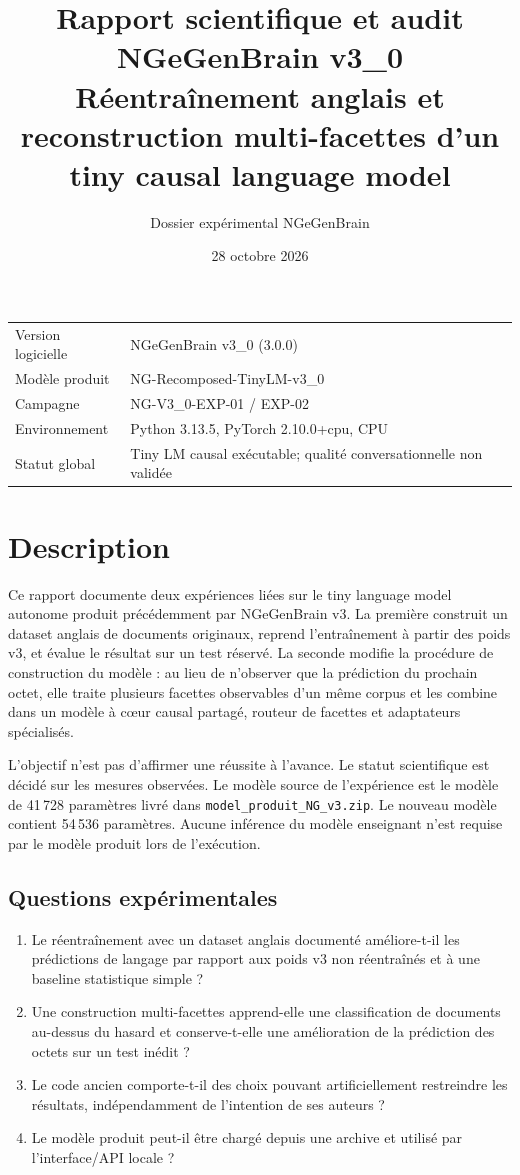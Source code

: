 \documentclass[11pt,a4paper]{article}
\title{\textbf{Rapport scientifique et audit}\\NGeGenBrain v3\_0\\[0.5em]\large Réentraînement anglais et reconstruction multi-facettes d'un tiny causal language model}
\author{Dossier expérimental NGeGenBrain}
\date{28 octobre 2026}
\begin{document}
\maketitle
\begin{center}
\begin{tabular}{ll}
\toprule
Version logicielle & NGeGenBrain v3\_0 (3.0.0)\\
Modèle produit & NG-Recomposed-TinyLM-v3\_0\\
Campagne & NG-V3\_0-EXP-01 / EXP-02\\
Environnement & Python 3.13.5, PyTorch 2.10.0+cpu, CPU\\
Statut global & Tiny LM causal exécutable; qualité conversationnelle non validée\\
\bottomrule
\end{tabular}
\end{center}
\tableofcontents
\newpage

\section{Description}
Ce rapport documente deux expériences liées sur le tiny language model autonome produit précédemment par NGeGenBrain v3. La première construit un dataset anglais de documents originaux, reprend l'entraînement à partir des poids v3, et évalue le résultat sur un test réservé. La seconde modifie la procédure de construction du modèle : au lieu de n'observer que la prédiction du prochain octet, elle traite plusieurs facettes observables d'un même corpus et les combine dans un modèle à cœur causal partagé, routeur de facettes et adaptateurs spécialisés.

L'objectif n'est pas d'affirmer une réussite à l'avance. Le statut scientifique est décidé sur les mesures observées. Le modèle source de l'expérience est le modèle de 41\,728 paramètres livré dans \texttt{model\_produit\_NG\_v3.zip}. Le nouveau modèle contient 54\,536 paramètres. Aucune inférence du modèle enseignant n'est requise par le modèle produit lors de l'exécution.

\subsection{Questions expérimentales}
\begin{enumerate}[leftmargin=*]
\item Le réentraînement avec un dataset anglais documenté améliore-t-il les prédictions de langage par rapport aux poids v3 non réentraînés et à une baseline statistique simple ?
\item Une construction multi-facettes apprend-elle une classification de documents au-dessus du hasard et conserve-t-elle une amélioration de la prédiction des octets sur un test inédit ?
\item Le code ancien comporte-t-il des choix pouvant artificiellement restreindre les résultats, indépendamment de l'intention de ses auteurs ?
\item Le modèle produit peut-il être chargé depuis une archive et utilisé par l'interface/API locale ?
\end{enumerate}
\end{document}
